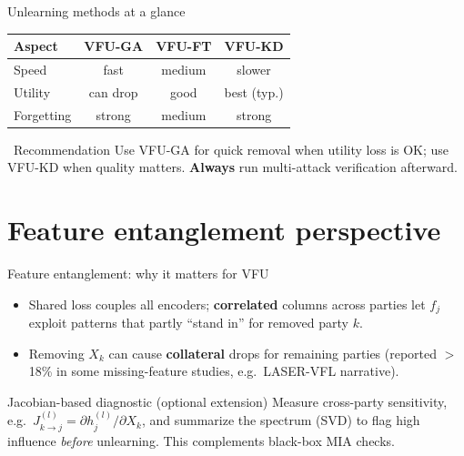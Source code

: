\documentclass[aspectratio=169, 11pt]{beamer}
\begin{document}
\begin{frame}{Unlearning methods at a glance}
  \begin{center}
  \small
  \begin{tabular}{lccc}
    \toprule
    \textbf{Aspect} & \textbf{VFU-GA} & \textbf{VFU-FT} & \textbf{VFU-KD} \\
    \midrule
    Speed & fast & medium & slower \\
    Utility & can drop & good & best (typ.) \\
    Forgetting & strong & medium & strong \\
    \bottomrule
  \end{tabular}
  \end{center}
  \vspace{0.5em}
  \begin{alertblock}{\faLightbulb\ Recommendation}
    Use \textsc{VFU-GA} for quick removal when utility loss is OK; use \textsc{VFU-KD} when quality matters. \textbf{Always} run multi-attack verification afterward.
  \end{alertblock}
\end{frame}

\section{Feature entanglement perspective}

\begin{frame}{Feature entanglement: why it matters for VFU}
  \begin{itemize}
    \item Shared loss couples all encoders; \textbf{correlated} columns across parties let $f_j$ exploit patterns that partly ``stand in'' for removed party $k$.
    \item Removing $X_k$ can cause \textbf{collateral} drops for remaining parties (reported $>$18\% in some missing-feature studies, e.g.\ LASER-VFL narrative).
  \end{itemize}
  \vspace{0.35em}
  \begin{block}{Jacobian-based diagnostic (optional extension)}
    Measure cross-party sensitivity, e.g.\ $J^{(l)}_{k\to j} = \partial h_j^{(l)} / \partial X_k$, and summarize the spectrum (SVD) to flag high influence \emph{before} unlearning. This complements black-box MIA checks.
  \end{block}
\end{frame}
\end{document}
